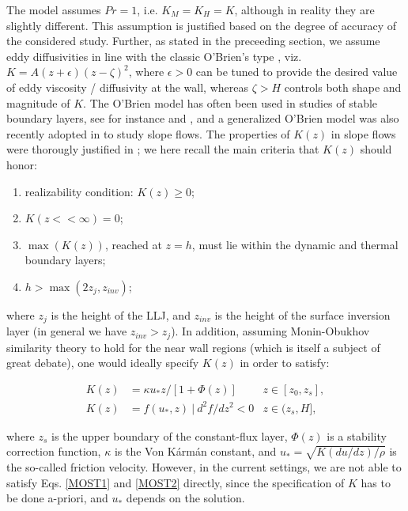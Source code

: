 The model assumes $Pr = 1$, i.e. $K_M = K_H = K$, although in reality they are slightly different. This assumption is justified based on the degree of accuracy of the considered study. 
Further, as stated in the preceeding section, we assume eddy diffusivities in line with the classic O'Brien's type \citep{O'Brien1970}, viz. $K = A(z + \epsilon)(z-\zeta)^2$, where $\epsilon>0$ can be tuned to provide the desired value of eddy viscosity / diffusivity at the wall, whereas $\zeta > H$ controls both shape and magnitude of $K$.
The O'Brien model has often been used in studies of stable boundary layers, see for instance \citet{pielke1984mesoscale} and \citet{Stull1988}, and a generalized O'Brien model was also recently adopted in \citet{grisogono2001katabatic} to study slope flows.
The properties of $K(z)$ in slope flows were thorougly justified in \citet{Grisogono2002};  we here recall the main criteria that $K(z)$ should honor:
%
\begin{enumerate}
\item realizability condition: $K(z) \ge 0$;
\item $K(z << \infty) = 0$;
\item $\max(K(z))$, reached at $z=h$, must lie within the dynamic and thermal boundary layers;
\item $h > \max(2 z_j, z_{inv})$;
\end{enumerate}
%
where $z_j$ is the height of the LLJ, and $z_{inv}$ is the height of the surface inversion layer (in general we have $z_{inv} > z_j$).
%
In addition, assuming Monin-Obukhov similarity theory to hold for the near wall regions (which is itself a subject of great debate), one would ideally specify $K(z)$ in order to satisfy:
%
\begin{linenomath*}
\begin{subequations}
\begin{align}
   K(z) & = \kappa u_* z/[1+\Phi(z)] & z \in [z_0,z_s], \label{MOST1}\\
   K(z) & = f(u_*,z) \ | \ d^2f/dz^2 < 0 & z \in (z_s,H], \label{MOST2}
\end{align}
\end{subequations}
\end{linenomath*}
%
where $z_s$ is the upper boundary of the constant-flux layer, $\Phi(z)$ is a stability correction function, $\kappa$ is the Von K\'arm\'an constant, and $u_* = \sqrt{K(du/dz)/\rho}$ is the so-called friction velocity.
However, in the current settings, we are not able to satisfy Eqs. \ref{MOST1} and \ref{MOST2} directly, since the specification of $K$ has to be done a-priori, and $u_*$ depends on the solution. 
